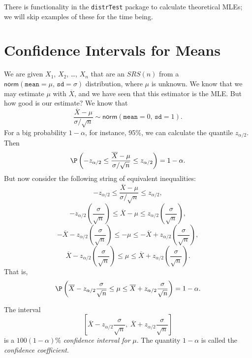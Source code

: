 \documentclass[captions=tableheading]{scrbook}
\begin{document}
There is functionality in the \texttt{distrTest} package \cite{Ruckdescheldistr} to calculate theoretical MLEs; we will skip examples of these for the time being.
\section{Confidence Intervals for Means}
\label{sec-9-2}

\label{sec:Confidence-Intervals-for-Means}

We are given \(X_{1}\), \(X_{2}\), \ldots{}, \(X_{n}\) that are an \(SRS(n)\) from a \(\mathsf{norm}(\mathtt{mean}=\mu,\,\mathtt{sd}=\sigma)\) distribution, where \(\mu\) is unknown. We know that we may estimate \(\mu\) with \(\overline{X}\), and we have seen that this estimator is the MLE. But how good is our estimate? We know that 
\begin{equation} 
\frac{\overline{X}-\mu}{\sigma/\sqrt{n}}\sim\mathsf{norm}(\mathtt{mean}=0,\,\mathtt{sd}=1).
\end{equation}
For a big probability \(1-\alpha\), for instance, 95\%, we can calculate the quantile \(z_{\alpha/2}\). Then
\begin{equation}
\P\left(-z_{\alpha/2}\leq\frac{\overline{X}-\mu}{\sigma/\sqrt{n}}\leq z_{\alpha/2}\right)=1-\alpha.
\end{equation}
But now consider the following string of equivalent inequalities:
\[
-z_{\alpha/2}\leq\frac{\overline{X}-\mu}{\sigma/\sqrt{n}}\leq z_{\alpha/2},
\]
\[
-z_{\alpha/2}\left(\frac{\sigma}{\sqrt{n}}\right)\leq\overline{X}-\mu\leq z_{\alpha/2}\left(\frac{\sigma}{\sqrt{n}}\right),
\]
\[
-\overline{X}-z_{\alpha/2}\left(\frac{\sigma}{\sqrt{n}}\right)\leq-\mu\leq-\overline{X}+z_{\alpha/2}\left(\frac{\sigma}{\sqrt{n}}\right),
\]
\[
\overline{X}-z_{\alpha/2}\left(\frac{\sigma}{\sqrt{n}}\right)\leq\mu\leq\overline{X}+z_{\alpha/2}\left(\frac{\sigma}{\sqrt{n}}\right).
\]
That is, 
\begin{equation}
\P\left(\overline{X}-z_{\alpha/2}\frac{\sigma}{\sqrt{n}}\leq\mu\leq\overline{X}+z_{\alpha/2}\frac{\sigma}{\sqrt{n}}\right)=1-\alpha.
\end{equation}

\begin{defn}
The interval
\begin{equation}
\left[\overline{X}-z_{\alpha/2}\frac{\sigma}{\sqrt{n}},\ \overline{X}+z_{\alpha/2}\frac{\sigma}{\sqrt{n}}\right]
\end{equation}
is a \(100(1-\alpha)\%\) \emph{confidence interval for} \(\mu\). The quantity \(1-\alpha\) is called the \emph{confidence coefficient}.
\end{defn}
\end{document}
